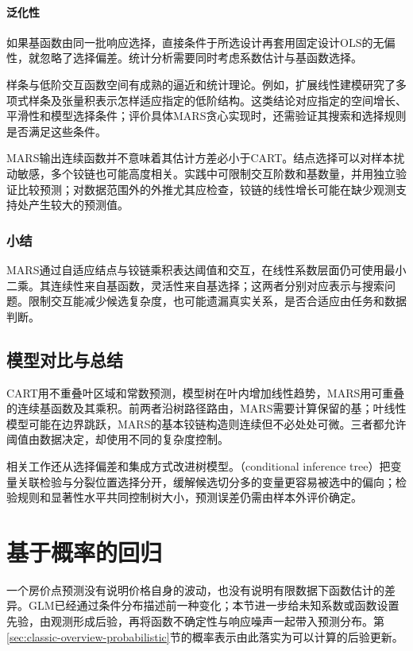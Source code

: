 \paragraph{泛化性}
如果基函数由同一批响应选择，直接条件于所选设计再套用固定设计OLS的无偏性，就忽略了选择偏差。统计分析需要同时考虑系数估计与基函数选择。

样条与低阶交互函数空间有成熟的逼近和统计理论。例如，扩展线性建模研究了多项式样条及张量积表示怎样适应指定的低阶结构。这类结论对应指定的空间增长、平滑性和模型选择条件；评价具体MARS贪心实现时，还需验证其搜索和选择规则是否满足这些条件。

MARS输出连续函数并不意味着其估计方差必小于CART。结点选择可以对样本扰动敏感，多个铰链也可能高度相关。实践中可限制交互阶数和基数量，并用独立验证比较预测；对数据范围外的外推尤其应检查，铰链的线性增长可能在缺少观测支持处产生较大的预测值。

\subsubsection{小结}

MARS通过自适应结点与铰链乘积表达阈值和交互，在线性系数层面仍可使用最小二乘。其连续性来自基函数，灵活性来自基选择；这两者分别对应表示与搜索问题。限制交互能减少候选复杂度，也可能遗漏真实关系，是否合适应由任务和数据判断。

\subsection{模型对比与总结}

CART用不重叠叶区域和常数预测，模型树在叶内增加线性趋势，MARS用可重叠的连续基函数及其乘积。前两者沿树路径路由，MARS需要计算保留的基；叶线性模型可能在边界跳跃，MARS的基本铰链构造则连续但不必处处可微。三者都允许阈值由数据决定，却使用不同的复杂度控制。

相关工作还从选择偏差和集成方式改进树模型。（conditional inference tree）把变量关联检验与分裂位置选择分开，缓解候选切分多的变量更容易被选中的偏向；检验规则和显著性水平共同控制树大小，预测误差仍需由样本外评价确定。

\section{基于概率的回归}
\label{sec:regression-probabilistic}

一个房价点预测没有说明价格自身的波动，也没有说明有限数据下函数估计的差异。GLM已经通过条件分布描述前一种变化；本节进一步给未知系数或函数设置先验，由观测形成后验，再将函数不确定性与响应噪声一起带入预测分布。第\ref{sec:classic-overview-probabilistic}节的概率表示由此落实为可以计算的后验更新。


